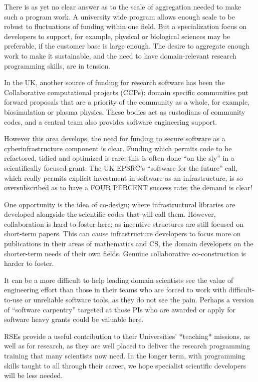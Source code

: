 There is as yet no clear answer as to the scale of aggregation needed to
make such a program work. A university wide program allows enough scale to
be robust to fluctuations of funding within one field.
But a specialization focus on developers to support, for example,
physical or biological
sciences may be preferable, if the customer base is large enough.
The desire to aggregate enough work to make it sustainable, and the need to
have domain-relevant research programming skills, are in tension.

In the UK, another source of funding for research software has been the
Collaborative computational projects (CCPs): domain specific communities put
forward proposals that are a priority of the community as a whole, for example,
biosimulation or plasma physics. These bodies act as custodians of community codes,
and a central team also provides software engineering support.

However this area develops, the need for funding to secure software as a
cyberinfrastructure component is clear. Funding which permits code to be
refactored, tidied and optimized  is rare; this is often done ``on the sly''
in a scientifically focused grant. The UK EPSRC's ``software for the future''
call, which really permits explicit investment in software as an infrastructure,
is so oversubscribed as to have a FOUR PERCENT success rate; the demand is clear!

One opportunity is the idea of co-design; where infrastructural libraries are
developed alongside the scientific codes that will call them. However,
collaboration is hard to foster here; as incentive structures are still focused
on short-term papers. This can cause infrastructure developers to
focus more on publications
in their areas of mathematics and CS, the domain developers on the shorter-term
needs of their own fields. Genuine collaborative co-construction
is harder to foster.

It can be a more difficult
to help leading domain scientists see the value of engineering effort than those
in their teams who are forced to work with difficult-to-use or unreliable
software tools, as they do not see the pain. Perhaps a version of
``software carpentry'' targeted at those PIs
who are awarded or apply for software heavy grants could be valuable here.

RSEs provide a useful contribution to their Universities' *teaching* missions,
as well as for research, as they are well placed to deliver the research programming
training that many scientists now need. In the
longer term, with programming skills taught to all through their career,
we hope specialist
scientific developers will be less needed.

